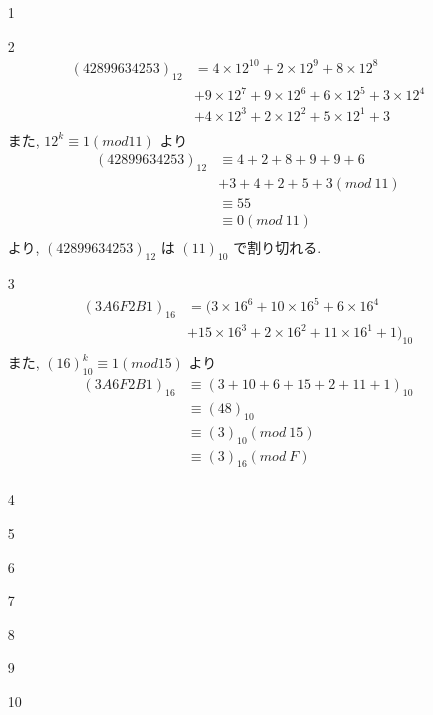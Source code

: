 \documentclass[12pt,a4paper]{jsarticle}
\begin{document}
\begin{enumerate}
 \item[1]  \mbox{} \\
 \item[2]  \mbox{} \\
 \begin{align*}
 (42899634253)_{12} &= 4 \times 12^{10} + 2 \times 12^{9} + 8 \times 12^{8} \\
  & + 9 \times 12^{7} + 9 \times 12^{6} + 6 \times 12^{5} +3 \times 12^{4} \\
  & + 4 \times 12^{3} + 2 \times 12^{2} + 5 \times 12^{1} + 3 \\
 \end{align*}
 また, $12^{k} \equiv 1(mod 11)$ より
 \begin{align*}
 (42899634253)_{12}
 &\equiv 4 + 2 + 8 + 9 + 9 + 6 \\
 & + 3 + 4 + 2 + 5 +3 (mod~11) \\
 &\equiv 55 \\
 &\equiv 0 (mod~11) \\ 
 \end{align*}
 より, $(42899634253)_{12}$ は $(11)_{10}$ で割り切れる.
 \item[3]  \mbox{} \\
 \begin{align*}
 (3A6F2B1)_{16} &= (3 \times 16^{6} + 10 \times 16^{5} + 6 \times 16^{4} \\
  & + 15 \times 16^{3} + 2 \times 16^{2} + 11 \times 16^{1} + 1)_{10}\\
 \end{align*}
 また, $(16)_{10}^{k} \equiv 1(mod 15)$ より
 \begin{align*}
 (3A6F2B1)_{16}
 &\equiv (3 + 10 +6 + 15 + 2 + 11 + 1)_{10} \\
 &\equiv (48)_{10} \\
 &\equiv (3)_{10} (mod~15) \\ 
 &\equiv (3)_{16} (mod~F) \\
 \end{align*}
 \item[4]  \mbox{} \\
 \item[5]  \mbox{} \\
 \item[6]  \mbox{} \\
 \item[7]  \mbox{} \\
 \item[8]  \mbox{} \\
 \item[9]  \mbox{} \\
 \item[10]  \mbox{} \\
\end{enumerate}
\pagebreak
\end{document}

